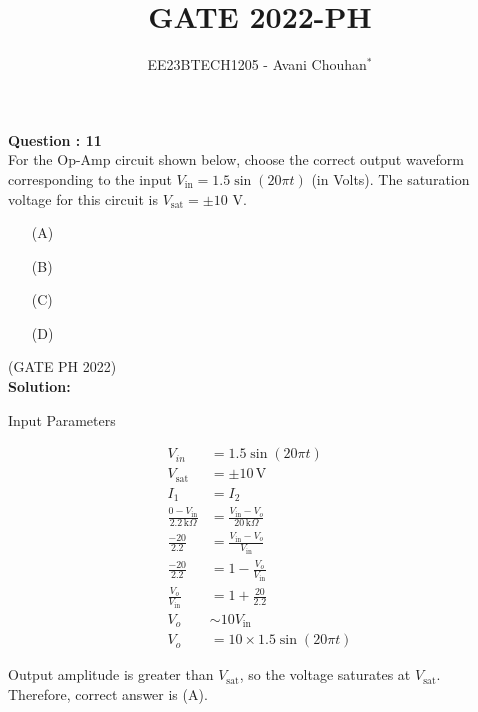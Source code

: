 \documentclass[journal,12pt,twocolumn]{IEEEtran}
\begin{document}

\vspace{3cm}

\title{GATE 2022-PH}
\author{EE23BTECH1205 - Avani Chouhan$^{*}$}
\maketitle
\newpage
\bigskip

\renewcommand{\thefigure}{\theenumi}
\renewcommand{\thetable}{\theenumi}

\vspace{3cm}
\textbf{Question : 11} \\
For the Op-Amp circuit shown below, choose the correct output waveform corresponding to the input \( V_{\text{in}} = 1.5 \sin(20 \pi t) \) (in Volts). The saturation voltage for this circuit is \( V_{\text{sat}} = \pm 10 \) V.
\begin{figure}[htb]
\centering
    
    \label{fig:1}
\end{figure}
\begin{enumerate}
  \item[(A)]
  \begin{figure}[H]
    \centering
    
    \label{fig:ap13}
\end{figure}	
  \item[(B)]  
  \begin{figure}[H]
    \centering
    
    \label{fig:ap06}
\end{figure}
  \item[(C)] 
  \item[(D)] 
   \begin{figure}[H]
    \centering
    
    \label{fig:ap16}
\end{figure}
\end{enumerate}

\hfill{(GATE PH 2022)}\\
\textbf{Solution:} \\

\begin{table}
  \centering
  
  
  \caption{Input Parameters}
  \label{tab:PH.11.table1}
\end{table}
\begin{align}
V_{in} &= 1.5 \sin(20\pi t)\\
V_{\text{sat}} &= \pm 10 \, \text{V}\\
I_1 &= I_2\\
\frac{0 - V_{\text{in}}}{2.2 \, \text{k}\Omega} &= \frac{V_{\text{in}} - V_o}{20 \, \text{k}\Omega}\\
\frac{-20}{2.2} &= \frac{V_{\text{in}} - V_o}{V_{\text{in}}}\\
\frac{-20}{2.2} &= 1 - \frac{V_o}{V_{\text{in}}}\\
\frac{V_o}{V_{\text{in}}} &= 1 + \frac{20}{2.2}\\
V_o &\sim 10 V_{\text{in}}\\
V_o &= 10 \times 1.5 \sin(20\pi t)
\end{align}

Output amplitude is greater than $V_{\text{sat}}$, so the voltage saturates at $V_{\text{sat}}$.\\
Therefore, correct answer is (A).
\end{document}
